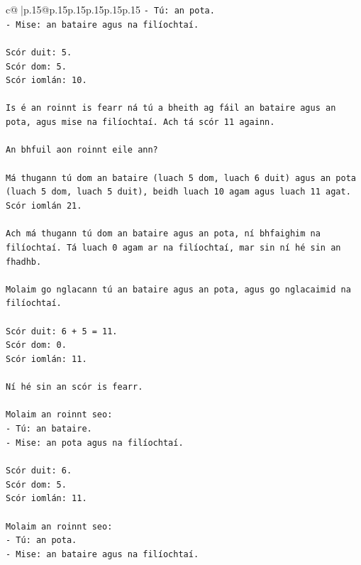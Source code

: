 \documentclass{article}
\begin{document}
{\begin{supertabular}{c@{$\;$}|p{.15\linewidth}@{}p{.15\linewidth}p{.15\linewidth}p{.15\linewidth}p{.15\linewidth}p{.15\linewidth}}
{{{\texttt{{-} Tú: an pota.} \\
\texttt{{-} Mise: an bataire agus na filíochtaí.} \\
\\ 
\texttt{Scór duit: 5.} \\
\texttt{Scór dom: 5.} \\
\texttt{Scór iomlán: 10.} \\
\\ 
\texttt{Is é an roinnt is fearr ná tú a bheith ag fáil an bataire agus an pota, agus mise na filíochtaí. Ach tá scór 11 againn.} \\
\\ 
\texttt{An bhfuil aon roinnt eile ann?} \\
\\ 
\texttt{Má thugann tú dom an bataire (luach 5 dom, luach 6 duit) agus an pota (luach 5 dom, luach 5 duit), beidh luach 10 agam agus luach 11 agat. Scór iomlán 21.} \\
\\ 
\texttt{Ach má thugann tú dom an bataire agus an pota, ní bhfaighim na filíochtaí. Tá luach 0 agam ar na filíochtaí, mar sin ní hé sin an fhadhb.} \\
\\ 
\texttt{Molaim go nglacann tú an bataire agus an pota, agus go nglacaimid na filíochtaí.} \\
\\ 
\texttt{Scór duit: 6 + 5 = 11.} \\
\texttt{Scór dom: 0.} \\
\texttt{Scór iomlán: 11.} \\
\\ 
\texttt{Ní hé sin an scór is fearr.} \\
\\ 
\texttt{Molaim an roinnt seo:} \\
\texttt{{-} Tú: an bataire.} \\
\texttt{{-} Mise: an pota agus na filíochtaí.} \\
\\ 
\texttt{Scór duit: 6.} \\
\texttt{Scór dom: 5.} \\
\texttt{Scór iomlán: 11.} \\
\\ 
\texttt{Molaim an roinnt seo:} \\
\texttt{{-} Tú: an pota.} \\
\texttt{{-} Mise: an bataire agus na filíochtaí.} \\
\\ 
}}}
\end{supertabular}}
\end{document}
